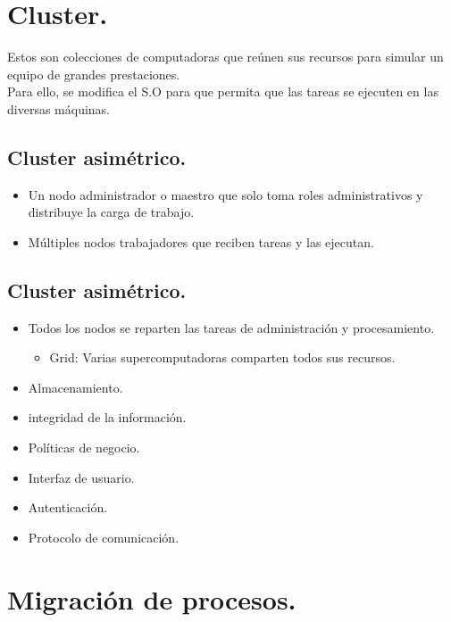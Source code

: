 \newpage
\part{Cluster.}

Estos son colecciones de computadoras que re\'{u}nen sus recursos para simular un equipo de grandes prestaciones.\\
Para ello, se modifica el S.O para que permita que las tareas se ejecuten en las diversas m\'{a}quinas.

\chapter{Cluster asim\'{e}trico.}

\begin{itemize}
	\item Un nodo administrador o maestro que solo toma roles administrativos y distribuye la carga de trabajo.
	\item M\'{u}ltiples nodos trabajadores que reciben tareas y las ejecutan.
\end{itemize}

\chapter{Cluster asim\'{e}trico.}

\begin{itemize}
	\item Todos los nodos se reparten las tareas de administraci\'{o}n y procesamiento.
	\begin{itemize}
		\item Grid: Varias supercomputadoras comparten todos sus recursos.
	\end{itemize}
\end{itemize}

\newpage

\begin{itemize}
	\item Almacenamiento.
	\item integridad de la informaci\'{o}n.
	\item Pol\'{i}ticas de negocio.
	\item Interfaz de usuario.
	\item Autenticaci\'{o}n.
	\item Protocolo de comunicaci\'{o}n.
\end{itemize}

\part{Migraci\'{o}n de procesos.}

